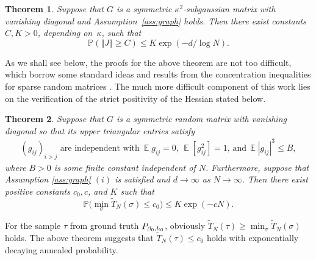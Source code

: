 \documentclass[letterpaper,11pt,reqno]{amsart}
\newtheorem{thm}{Theorem}[section]
\renewcommand{\le}{\leqslant}
\renewcommand{\ge}{\geqslant}
\newcommand{\norm}[1]{\left\Vert#1\right\Vert}
\newcommand{\cG}{\mathcal{G}}\newcommand{\cH}{\mathcal{H}}\newcommand{\cI}{\mathcal{I}}
\newcommand{\mvgs}{{\sigma}}
\newcommand{\mvgt}{{\tau}}
\newcommand{\bP}{\mathbb{P}}\newcommand{\bQ}{\mathbb{Q}}\newcommand{\bR}{\mathbb{R}}
\DeclareMathOperator{\E}{\mathds{E}}
\begin{document}

\begin{thm}\label{thm:J-norm}
Suppose that $G$ is a symmetric $\kappa^2$-subgaussian matrix with vanishing diagonal and Assumption~\ref{ass:graph} holds. 
Then there exist constants $C,K>0$, depending on~$\kappa$, such that
\[
\bP(\norm{J} \ge C) \le K \exp(-d/\log N).
\]

\end{thm}

As we shall see below, the proofs for the above theorem are not too difficult, which borrow some standard ideas and results from the concentration inequalities for sparse random matrices \cite{BvH16,CDG23}. The much more difficult component of this work lies on the verification of the strict positivity of the Hessian stated below.

\begin{thm}\label{thm:TN-check}
Suppose that 
$G$ is a symmetric random matrix with vanishing diagonal so that its upper triangular entries satisfy
        \begin{align}\label{eq:disorder-cond}
        \text{$(g_{ij})_{i>j}$ are independent with} \ \E{g_{ij}} = 0,\,{\E[g_{ij}^2]}=1,\,\text{and}\,\E|g_{ij}|^3 \le B,
        \end{align}
where $B>0$ is some finite constant independent of $N$. Furthermore, suppose that Assumption \ref{ass:graph} $(i)$ is satisfied and $d\to\infty$ as $N\to\infty$. Then there exist positive constants $c_0,c$, and $K$ such that
    \[
    \bP\bigl(\min_{\mvgs}\widetilde{T}_N(\mvgs) \le c_0\bigr) \le K \exp( - cN).
    \] %
\end{thm}

For the sample $\mvgt$ from ground truth $P_{\beta_0,h_0}$, obviously $\widetilde{T}_N(\mvgt) \ge  \min_{\mvgs}\widetilde{T}_N(\mvgs)$ holds. The above theorem suggests that $\widetilde{T}_N(\mvgt) \le c_0$ holds with exponentially decaying annealed probability. 
\end{document}
